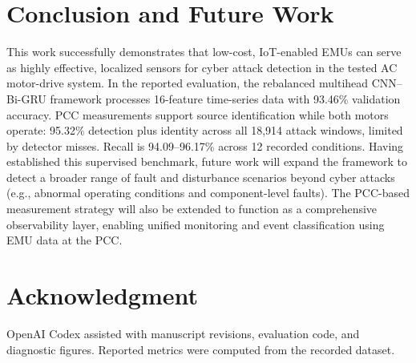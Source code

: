 \documentclass[conference]{IEEEtran}
\begin{document}
\section{Conclusion and Future Work}

This work successfully demonstrates that low-cost, IoT-enabled EMUs can serve as highly effective, localized sensors for cyber attack detection in the tested AC motor-drive system. In the reported evaluation, the rebalanced multihead CNN--Bi-GRU framework processes 16-feature time-series data with 93.46\% validation accuracy. PCC measurements support source identification while both motors operate: 95.32\% detection plus identity across all 18,914 attack windows, limited by detector misses. Recall is 94.09--96.17\% across 12 recorded conditions. Having established this supervised benchmark, future work will expand the framework to detect a broader range of fault and disturbance scenarios beyond cyber attacks (e.g., abnormal operating conditions and component-level faults). The PCC-based measurement strategy will also be extended  to function as a comprehensive observability layer, enabling unified monitoring and event classification using EMU data at the PCC.

\section*{Acknowledgment}
OpenAI Codex assisted with manuscript revisions, evaluation code, and diagnostic figures. Reported metrics were computed from the recorded dataset.



\end{document}

